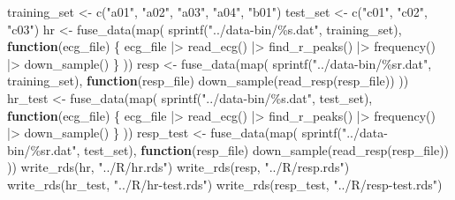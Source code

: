 \documentclass[
]{article}
\newenvironment{Shaded}{\begin{snugshade}}{\end{snugshade}}
\newcommand{\ControlFlowTok}[1]{\textcolor[rgb]{0.13,0.29,0.53}{\textbf{#1}}}
\newcommand{\FunctionTok}[1]{\textcolor[rgb]{0.00,0.00,0.00}{#1}}
\newcommand{\NormalTok}[1]{#1}
\newcommand{\OtherTok}[1]{\textcolor[rgb]{0.56,0.35,0.01}{#1}}
\newcommand{\SpecialCharTok}[1]{\textcolor[rgb]{0.00,0.00,0.00}{#1}}
\newcommand{\StringTok}[1]{\textcolor[rgb]{0.31,0.60,0.02}{#1}}
\begin{document}
\begin{Shaded}
\begin{Highlighting}[]
\NormalTok{training\_set }\OtherTok{\textless{}{-}} \FunctionTok{c}\NormalTok{(}\StringTok{"a01"}\NormalTok{, }\StringTok{"a02"}\NormalTok{, }\StringTok{"a03"}\NormalTok{, }\StringTok{"a04"}\NormalTok{, }\StringTok{"b01"}\NormalTok{)}
\NormalTok{test\_set }\OtherTok{\textless{}{-}} \FunctionTok{c}\NormalTok{(}\StringTok{"c01"}\NormalTok{, }\StringTok{"c02"}\NormalTok{, }\StringTok{"c03"}\NormalTok{)}
\NormalTok{hr }\OtherTok{\textless{}{-}} \FunctionTok{fuse\_data}\NormalTok{(}\FunctionTok{map}\NormalTok{(}
  \FunctionTok{sprintf}\NormalTok{(}\StringTok{"../data{-}bin/\%s.dat"}\NormalTok{, training\_set),}
  \ControlFlowTok{function}\NormalTok{(ecg\_file) \{}
\NormalTok{    ecg\_file }\SpecialCharTok{|\textgreater{}}
      \FunctionTok{read\_ecg}\NormalTok{() }\SpecialCharTok{|\textgreater{}}
      \FunctionTok{find\_r\_peaks}\NormalTok{() }\SpecialCharTok{|\textgreater{}}
      \FunctionTok{frequency}\NormalTok{() }\SpecialCharTok{|\textgreater{}}
      \FunctionTok{down\_sample}\NormalTok{()}
\NormalTok{  \}}
\NormalTok{))}
\NormalTok{resp }\OtherTok{\textless{}{-}} \FunctionTok{fuse\_data}\NormalTok{(}\FunctionTok{map}\NormalTok{(}
  \FunctionTok{sprintf}\NormalTok{(}\StringTok{"../data{-}bin/\%sr.dat"}\NormalTok{, training\_set),}
  \ControlFlowTok{function}\NormalTok{(resp\_file) }\FunctionTok{down\_sample}\NormalTok{(}\FunctionTok{read\_resp}\NormalTok{(resp\_file))}
\NormalTok{))}
\NormalTok{hr\_test }\OtherTok{\textless{}{-}} \FunctionTok{fuse\_data}\NormalTok{(}\FunctionTok{map}\NormalTok{(}
  \FunctionTok{sprintf}\NormalTok{(}\StringTok{"../data{-}bin/\%s.dat"}\NormalTok{, test\_set),}
  \ControlFlowTok{function}\NormalTok{(ecg\_file) \{}
\NormalTok{    ecg\_file }\SpecialCharTok{|\textgreater{}}
      \FunctionTok{read\_ecg}\NormalTok{() }\SpecialCharTok{|\textgreater{}}
      \FunctionTok{find\_r\_peaks}\NormalTok{() }\SpecialCharTok{|\textgreater{}}
      \FunctionTok{frequency}\NormalTok{() }\SpecialCharTok{|\textgreater{}}
      \FunctionTok{down\_sample}\NormalTok{()}
\NormalTok{  \}}
\NormalTok{))}
\NormalTok{resp\_test }\OtherTok{\textless{}{-}} \FunctionTok{fuse\_data}\NormalTok{(}\FunctionTok{map}\NormalTok{(}
  \FunctionTok{sprintf}\NormalTok{(}\StringTok{"../data{-}bin/\%sr.dat"}\NormalTok{, test\_set),}
  \ControlFlowTok{function}\NormalTok{(resp\_file) }\FunctionTok{down\_sample}\NormalTok{(}\FunctionTok{read\_resp}\NormalTok{(resp\_file))}
\NormalTok{))}
\FunctionTok{write\_rds}\NormalTok{(hr, }\StringTok{"../R/hr.rds"}\NormalTok{)}
\FunctionTok{write\_rds}\NormalTok{(resp, }\StringTok{"../R/resp.rds"}\NormalTok{)}
\FunctionTok{write\_rds}\NormalTok{(hr\_test, }\StringTok{"../R/hr{-}test.rds"}\NormalTok{)}
\FunctionTok{write\_rds}\NormalTok{(resp\_test, }\StringTok{"../R/resp{-}test.rds"}\NormalTok{)}
\end{Highlighting}
\end{Shaded}
\end{document}
